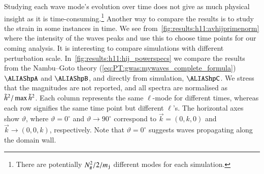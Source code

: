

    Studying each wave mode's evolution over time does not give as much physical insight as it is time-consuming.\footnote{There are potentially $N_\#^2/2 / m_{\mathtt{j}}$ different modes for each simulation.} %
    Another way to compare the results is to study the strain in some instances in time. 
    We see from~\cref{fig:results:h11:avhijprimenorm} where the intensity of the waves peaks and use this to choose time points for our coming analysis. It is interesting to compare simulations with different perturbation scale. %
    In~\cref{fig:results:h11:hij_powerspecs} we compare the results from the Nambu--Goto theory (\cref{eq:PT:gwas:mywaves_complete_formula}) $\hpA$ and $\hpB$, %
    and directly from simulation, $\hpC$. %
    We stress that the magnitudes are not reported, and all spectra are normalised as $\tilde{h}^2/\max{\tilde{h}^2}$. Each column represents the same $\ell$-mode for different times, whereas each row signifies the same time point but different $\ell$'s. The horizontal axes show $\vartheta$, where $\vartheta=0^\circ$ and $\vartheta \to 90^\circ$ correspond to $\vec{k} =(0,k,0)$ and $\vec{k} \to (0,0,k)$, respectively. Note that $\vartheta=0^\circ$ suggests waves propagating along the domain wall.


